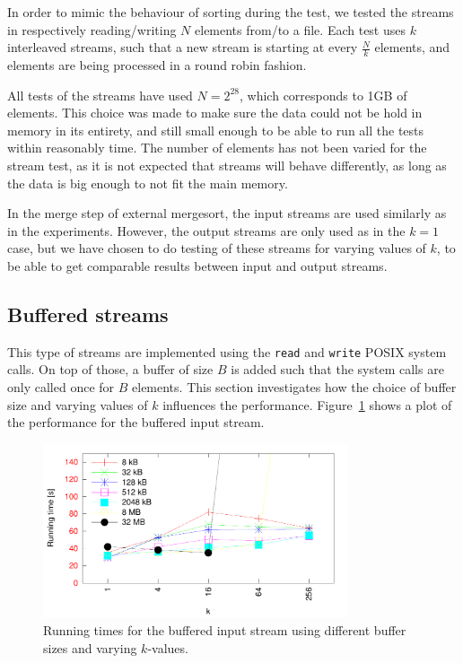 \documentclass[a4paper,12pt]{article}
\begin{document}
In order to mimic the behaviour of sorting during the test, we
tested the streams in respectively reading/writing $N$ elements from/to a file. Each test uses $k$ interleaved streams, such
that a new stream is starting at every $\frac{N}{k}$ elements, and
elements are being processed in a round robin fashion.

All tests of the streams have used $N = 2^{28}$, which corresponds to
1GB of elements. This choice was made to make sure the data could not be hold in memory in its entirety, and still small enough to be able to run all the tests within reasonably time. The
number of elements has not been varied for the stream test, as it is not
expected that streams will behave differently, as long as the data is
big enough to not fit the main memory.

In the merge step of external mergesort, the input streams are
used similarly as in the experiments. However, the output streams are only used
as in the $k = 1$ case, but we have chosen to do testing of these streams
for varying values of $k$, to be able to get comparable results
between input and output streams.

\subsection{Buffered streams}
\label{sec:buffered-streams}
This type of streams are implemented using the \texttt{read} and
\texttt{write} POSIX system calls. On top of those, a buffer of size
$B$ is added such that the system calls are only called once for $B$ elements. This section investigates how the choice of buffer size and varying
values of $k$ influences the
performance.
Figure~\ref{fig:buffered-input} shows a plot of the performance for the buffered input stream.

\begin{figure}[h!]
  \centering
  \includegraphics[width=0.8\textwidth]{buffered_input}
  \caption{Running times for the buffered input stream using different
    buffer sizes and varying $k$-values.}
  \label{fig:buffered-input}
\end{figure}
\end{document}
